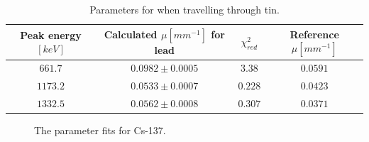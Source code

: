 \documentclass[12pt]{report}
\begin{document}
\begin{table}[ht]
    \centering
    \begin{tabular}{|c|c|c|c|}
    \hline
        Peak energy $[keV]$ & Calculated $\mu [mm^{-1}]$ for lead   & $\chi^2_{red}$    & Reference $\mu [mm^{-1}]$ \\ \hline
        $661.7$               & $0.0982 \pm 0.0005$                 & $3.38$            & $0.0591$\\ \hline
        $1173.2$              & $0.0533 \pm 0.0007$                 & $0.228$           & $0.0423$\\ \hline
        $1332.5$              & $0.0562 \pm 0.0008$                 & $0.307$           & $0.0371$\\ \hline
    \end{tabular}
    \caption{Parameters for when travelling through tin.}
    \label{tab:tdata}
\end{table}

\begin{figure}[ht]
    \centering
    
    
    
    \caption{The parameter fits for Cs-137.}
    \label{figure:cs137}
    
\end{figure}
\end{document}
